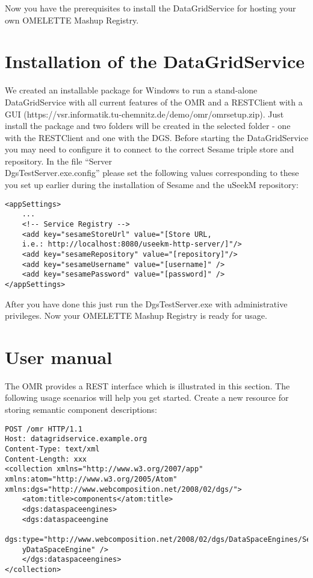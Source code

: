 Now you have the prerequisites to install the DataGridService for hosting your own
OMELETTE Mashup Registry.

\section{Installation of the DataGridService}
We created an installable package for Windows to run a stand-alone DataGridService with all
current features of the OMR and a RESTClient with a GUI
(https://vsr.informatik.tu-chemnitz.de/demo/omr/omrsetup.zip). Just install the package and
two folders will be created in the selected folder - one with the RESTClient and one with the
DGS. Before starting the DataGridService you may need to configure it to connect to the
correct Sesame triple store and repository. In the file “Server\\DgsTestServer.exe.config”
please set the following values corresponding to these you set up earlier during the
installation of Sesame and the uSeekM repository:

\begin{lstlisting}[style=consola]
<appSettings>
	...
	<!-- Service Registry -->
	<add key="sesameStoreUrl" value="[Store URL,
	i.e.: http://localhost:8080/useekm-http-server/]"/>
	<add key="sesameRepository" value="[repository]"/>
	<add key="sesameUsername" value="[username]" />
	<add key="sesamePassword" value="[password]" />
</appSettings>

\end{lstlisting}

After you have done this just run the DgsTestServer.exe with administrative privileges. Now
your OMELETTE Mashup Registry is ready for usage.

\section{User manual}
The OMR provides a REST interface which is illustrated in this section. The following usage scenarios will help you get started.
Create a new resource for storing semantic component descriptions:

\begin{lstlisting}[style=consola]
POST /omr HTTP/1.1
Host: datagridservice.example.org
Content-Type: text/xml
Content-Length: xxx
<collection xmlns="http://www.w3.org/2007/app"
xmlns:atom="http://www.w3.org/2005/Atom"
xmlns:dgs="http://www.webcomposition.net/2008/02/dgs/">
	<atom:title>components</atom:title>
	<dgs:dataspaceengines>
	<dgs:dataspaceengine
	dgs:type="http://www.webcomposition.net/2008/02/dgs/DataSpaceEngines/ServiceRegistr
	yDataSpaceEngine" />
	</dgs:dataspaceengines>
</collection>

\end{lstlisting}

